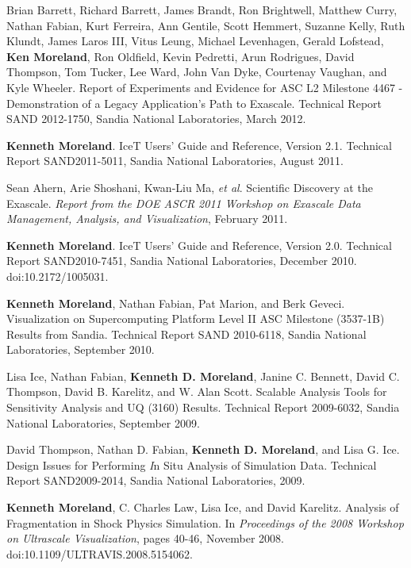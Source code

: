 \begin{enumerate}[label={[\arabic*]}, left=0pt]
  Brian Barrett, Richard Barrett, James Brandt, Ron Brightwell, Matthew Curry, Nathan Fabian, Kurt Ferreira, Ann Gentile, Scott Hemmert, Suzanne Kelly, Ruth Klundt, James Laros III, Vitus Leung, Michael Levenhagen, Gerald Lofstead, \textbf{Ken Moreland}, Ron Oldfield, Kevin Pedretti, Arun Rodrigues, David Thompson, Tom Tucker, Lee Ward, John Van Dyke, Courtenay Vaughan, and Kyle Wheeler.
  Report of Experiments and Evidence for ASC L2 Milestone 4467 - Demonstration of a Legacy Application’s Path to Exascale.
Technical Report SAND 2012-1750, Sandia National Laboratories, March 2012.
\item  %
  \textbf{Kenneth Moreland}.
  {IceT} Users' Guide and Reference, Version 2.1.
Technical Report SAND2011-5011, Sandia National Laboratories, August 2011.
\item  %
  Sean Ahern, Arie Shoshani, Kwan-Liu Ma, \emph{et al}.
  Scientific Discovery at the Exascale.
\emph{Report from the DOE ASCR 2011 Workshop on Exascale Data Management, Analysis, and Visualization}, February 2011.
\item  %
  \textbf{Kenneth Moreland}.
  IceT Users’ Guide and Reference, Version 2.0.
Technical Report SAND2010-7451, Sandia National Laboratories, December 2010.
  doi:10.2172/1005031.
\item  %
  \textbf{Kenneth Moreland}, Nathan Fabian, Pat Marion, and Berk Geveci.
  Visualization on Supercomputing Platform Level {II} {ASC} Milestone {(3537-1B)} Results from {Sandia}.
Technical Report SAND 2010-6118, Sandia National Laboratories, September 2010.
\item  %
  Lisa Ice, Nathan Fabian, \textbf{Kenneth D. Moreland}, Janine C. Bennett, David C. Thompson, David B. Karelitz, and W. Alan Scott.
  Scalable Analysis Tools for Sensitivity Analysis and {UQ} (3160) Results.
Technical Report 2009-6032, Sandia National Laboratories, September 2009.
\item  %
  David Thompson, Nathan D. Fabian, \textbf{Kenneth D. Moreland}, and Lisa G. Ice.
  Design Issues for Performing {\textit In Situ} Analysis of Simulation Data.
Technical Report SAND2009-2014, Sandia National Laboratories, 2009.
\item  %
  \textbf{Kenneth Moreland}, C. Charles Law, Lisa Ice, and David Karelitz.
  Analysis of Fragmentation in Shock Physics Simulation.
  In \emph{Proceedings of the 2008 Workshop on Ultrascale Visualization}, pages 40-46, November 2008.
  doi:10.1109/ULTRAVIS.2008.5154062.

\end{enumerate}
